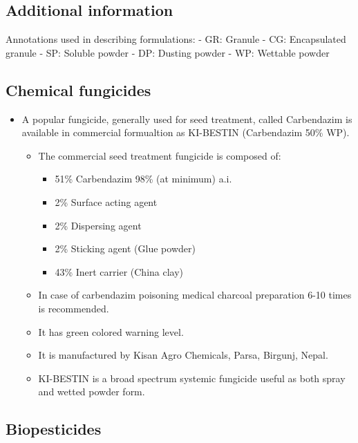 \documentclass[
  openany]{book}
\providecommand{\tightlist}{%
  \setlength{\itemsep}{0pt}\setlength{\parskip}{0pt}}
\begin{document}
\hypertarget{additional-information}{%
\subsection{Additional information}\label{additional-information}}

Annotations used in describing formulations:
- GR: Granule
- CG: Encapsulated granule
- SP: Soluble powder
- DP: Dusting powder
- WP: Wettable powder

\hypertarget{chemical-fungicides}{%
\subsection{Chemical fungicides}\label{chemical-fungicides}}

\begin{itemize}
\tightlist
\item
  A popular fungicide, generally used for seed treatment, called Carbendazim is available in commercial formualtion as KI-BESTIN (Carbendazim 50\% WP).

  \begin{itemize}
  \tightlist
  \item
    The commercial seed treatment fungicide is composed of:

    \begin{itemize}
    \tightlist
    \item
      51\% Carbendazim 98\% (at minimum) a.i.
    \item
      2\% Surface acting agent
    \item
      2\% Dispersing agent
    \item
      2\% Sticking agent (Glue powder)
    \item
      43\% Inert carrier (China clay)
    \end{itemize}
  \item
    In case of carbendazim poisoning medical charcoal preparation 6-10 times is recommended.
  \item
    It has green colored warning level.
  \item
    It is manufactured by Kisan Agro Chemicals, Parsa, Birgunj, Nepal.
  \item
    KI-BESTIN is a broad spectrum systemic fungicide useful as both spray and wetted powder form.
  \end{itemize}
\end{itemize}

\hypertarget{biopesticides}{%
\subsection{Biopesticides}\label{biopesticides}}
\end{document}
